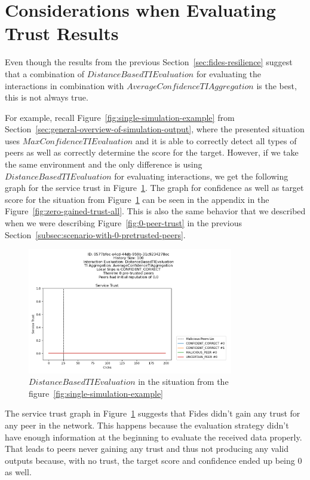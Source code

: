 \newpage
\section{Considerations when Evaluating Trust Results}
\label{sec:other-findings}

Even though the results from the previous Section~\ref{sec:fides-resilience} suggest that a combination of $DistanceBasedTIEvaluation$ for evaluating the interactions in combination with $AverageConfidenceTIAggregation$ is the best, this is not always true.

For example, recall Figure~\ref{fig:single-simulation-example} from Section~\ref{sec:general-overview-of-simulation-output}, where the presented situation uses $MaxConfidenceTIEvaluation$ and it is able to correctly detect all types of peers as well as correctly determine the score for the target.
However, if we take the same environment and the only difference is using $DistanceBasedTIEvaluation$ for evaluating interactions, we get the following graph for the service trust in  Figure~\ref{fig:zero-gained-trust}. The graph for confidence as well as target score for the situation from Figure~\ref{fig:zero-gained-trust} can be seen in the appendix in the Figure~\ref{fig:zero-gained-trust-all}.
This is also the same behavior that we described when we were describing Figure~\ref{fig:0-peer-trust} in the previous Section~\ref{subsec:scenario-with-0-pretrusted-peers}.

\begin{figure}[ht]
    \centering
    \includegraphics[width=0.8\textwidth]{assets/zero_gained_trust.png}
    \caption{$DistanceBasedTIEvaluation$ in the situation from the figure~\ref{fig:single-simulation-example}}
    \label{fig:zero-gained-trust}
\end{figure}

The service trust graph in Figure~\ref{fig:zero-gained-trust} suggests that Fides didn't gain any trust for any peer in the network.
This happens because the evaluation strategy didn't have enough information at the beginning to evaluate the received data properly.
That leads to peers never gaining any trust and thus not producing any valid outputs because, with no trust, the target score and confidence ended up being $0$ as well.


